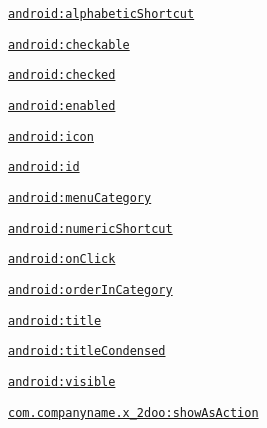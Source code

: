 {\tt \hyperlink{classandroid_1_1support_1_1v4_1_1_r_1_1styleable_e18b4d4aaf319c1b053a7a2b6e895ec4}{android:alphabeticShortcut}}

{\tt \hyperlink{classandroid_1_1support_1_1v4_1_1_r_1_1styleable_b68a374916d519737c3a28fed80dc49a}{android:checkable}}

{\tt \hyperlink{classandroid_1_1support_1_1v4_1_1_r_1_1styleable_2e34104aed0ac276e13e97441de38b68}{android:checked}}

{\tt \hyperlink{classandroid_1_1support_1_1v4_1_1_r_1_1styleable_202fdf83a524efca222f4f5d085c0628}{android:enabled}}

{\tt \hyperlink{classandroid_1_1support_1_1v4_1_1_r_1_1styleable_2c938bdde9b6c2d73c74e524bd9000a6}{android:icon}}

{\tt \hyperlink{classandroid_1_1support_1_1v4_1_1_r_1_1styleable_0d7c59b15e49342fd0002c967ac93807}{android:id}}

{\tt \hyperlink{classandroid_1_1support_1_1v4_1_1_r_1_1styleable_4ee75f908e53006cfb8e37bc47033aed}{android:menuCategory}}

{\tt \hyperlink{classandroid_1_1support_1_1v4_1_1_r_1_1styleable_a8c445a29006c1bc48e53880a916394f}{android:numericShortcut}}

{\tt \hyperlink{classandroid_1_1support_1_1v4_1_1_r_1_1styleable_fa40cc2323bbb032c868308d16e7d64e}{android:onClick}}

{\tt \hyperlink{classandroid_1_1support_1_1v4_1_1_r_1_1styleable_7976bdeaae19ffc9069033a5afb3458f}{android:orderInCategory}}

{\tt \hyperlink{classandroid_1_1support_1_1v4_1_1_r_1_1styleable_1723212f5e94f798ff04dbfee2d97cf8}{android:title}}

{\tt \hyperlink{classandroid_1_1support_1_1v4_1_1_r_1_1styleable_893c55eac75b4f4c10023c8c9326e6ee}{android:titleCondensed}}

{\tt \hyperlink{classandroid_1_1support_1_1v4_1_1_r_1_1styleable_f5ec2e318cacb05a88574400015d117b}{android:visible}}

{\tt \hyperlink{classandroid_1_1support_1_1v4_1_1_r_1_1styleable_97f9c113efa1633c7665e13fd89ade63}{com.companyname.x\_\-2doo:showAsAction}}

